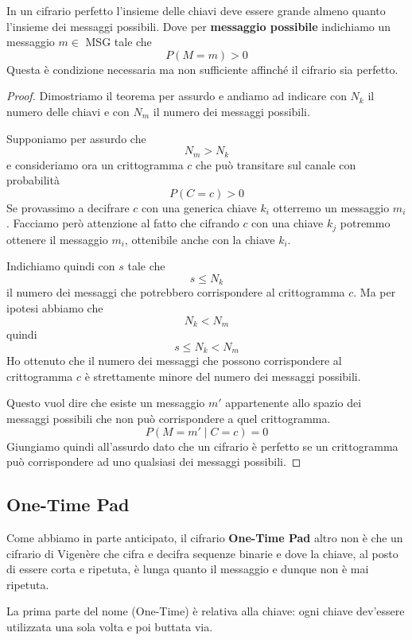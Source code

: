 \begin{theorem}[Shannon]
	In un cifrario perfetto l'insieme delle chiavi deve essere grande almeno quanto l'insieme dei messaggi possibili.
	Dove per \textbf{messaggio possibile} indichiamo un messaggio $m \in$ MSG tale che
	\[ P(M = m) > 0 \]
	Questa \`e condizione necessaria ma non sufficiente affinch\'e il cifrario sia perfetto.
	\begin{proof}
		Dimostriamo il teorema per assurdo e andiamo ad indicare con $N_k$ il numero delle chiavi e con $N_m$ il numero
		dei messaggi possibili.

		Supponiamo per assurdo che
		\[ N_m > N_k \]
		e consideriamo ora un crittogramma $c$ che pu\`o transitare sul canale con probabilit\`a
		\[ P(C = c) > 0 \]
		Se provassimo a decifrare $c$ con una generica chiave $k_i$ otterremo un messaggio $m_i$. Facciamo per\`o
		attenzione al fatto che cifrando $c$ con una chiave $k_j$ potremmo ottenere il messaggio $m_i$, ottenibile anche
		con la chiave $k_i$.

		Indichiamo quindi con $s$ tale che
		\[ s \leq N_k \]
		il numero dei messaggi che potrebbero corrispondere al crittogramma $c$. Ma per ipotesi abbiamo che
		\[ N_k < N_m \]
		quindi
		\[ s \leq N_k < N_m \]
		Ho ottenuto che il numero dei messaggi che possono corrispondere al crittogramma $c$ \`e strettamente minore
		del numero dei messaggi possibili.

		Questo vuol dire che esiste un messaggio $m'$ appartenente allo spazio dei messaggi possibili che non pu\`o
		corrispondere a quel crittogramma.
		\[ P(M = m' \mid C = c) = 0 \]
		Giungiamo quindi all'assurdo dato che un cifrario \`e perfetto se un crittogramma pu\`o corrispondere ad uno
		qualsiasi dei messaggi possibili.
	\end{proof}
\end{theorem}

\subsection{One-Time Pad}
Come abbiamo in parte anticipato, il cifrario \textbf{One-Time Pad} altro non \`e che un cifrario di Vigen\`ere che
cifra e decifra sequenze binarie e dove la chiave, al posto di essere corta e ripetuta, \`e lunga quanto il messaggio
e dunque non \`e mai ripetuta.

La prima parte del nome (One-Time) \`e relativa alla chiave: ogni chiave dev'essere utilizzata una sola volta e poi
buttata via.

